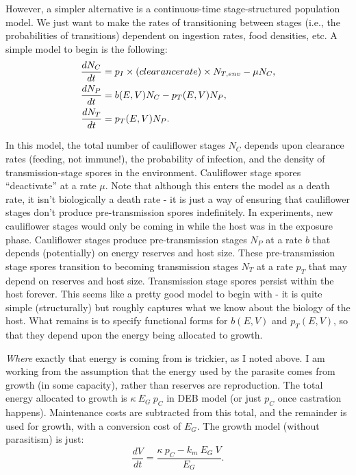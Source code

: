 \documentclass[11pt,reqno,final,pdftex]{amsart}\usepackage[]{graphicx}\usepackage[]{color}
\theoremstyle{plain}
\numberwithin{equation}{part}
\begin{document}
However, a simpler alternative is a continuous-time stage-structured population model.
We just want to make the rates of transitioning between stages (i.e., the probabilities of transitions) dependent on ingestion rates, food densities, etc.
A simple model to begin is the following:
\begin{align}
\frac{dN_C}{dt} &= p_I \times \text(clearance rate) \times N_{T,env} - \mu N_C, \\
\frac{dN_P}{dt} &= b(E,V) N_C - p_T(E,V) N_P, \\
\frac{dN_T}{dt} &= p_T(E,V) N_P.
\end{align}

In this model, the total number of cauliflower stages $N_C$ depends upon clearance rates (feeding, not immune!), the probability of infection, and the density of transmission-stage spores in the environment.
Cauliflower stage spores ``deactivate'' at a rate $\mu$.
Note that although this enters the model as a death rate, it isn't biologically a death rate - it is just a way of ensuring that cauliflower stages don't produce pre-transmission spores indefinitely.
In experiments, new cauliflower stages would only be coming in while the host was in the exposure phase.
Cauliflower stages produce pre-transmission stages $N_P$ at a rate $b$ that depends (potentially) on energy reserves and host size.
These pre-transmission stage spores transition to becoming transmission stages $N_T$ at a rate $p_T$ that may depend on reserves and host size.
Transmission stage spores persist within the host forever.
This seems like a pretty good model to begin with - it is quite simple (structurally) but roughly captures what we know about the biology of the host.
What remains is to specify functional forms for $b(E,V)$ and $p_T(E,V)$, so that they depend upon the energy being allocated to growth.

\emph{Where} exactly that energy is coming from is trickier, as I noted above.
I am working from the assumption that the energy used by the parasite comes from growth (in some capacity), rather than reserves are reproduction.
The total energy allocated to growth is $\kappa~E_G~p_C$ in DEB model (or just $p_C$ once castration happens).
Maintenance costs are subtracted from this total, and the remainder is used for growth, with a conversion cost of $E_G$.
The growth model (without parasitism) is just:
\begin{equation}
\frac{dV}{dt} = \frac{\kappa~p_C - k_m~E_G~V}{E_G}.
\end{equation}
\end{document}
